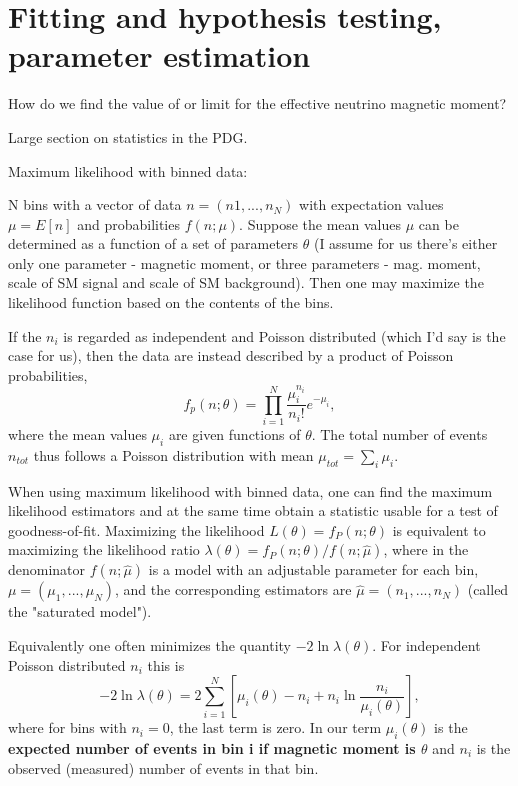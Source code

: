 \section{Fitting and hypothesis testing, parameter estimation}
How do we find the value of or limit for the effective neutrino magnetic moment?

Large section on statistics in the PDG.

Maximum likelihood with binned data:

N bins with a vector of data $n=\left(n1,...,n_N \right)$ with expectation values $\mu=E\left[n\right]$ and probabilities $f\left(n;\mu\right)$. Suppose the mean values $\mu$ can be determined as a function of a set of parameters $\theta$ (I assume for us there's either only one parameter - magnetic moment, or three parameters - mag. moment, scale of SM signal and scale of SM background). Then one may maximize the likelihood function based on the contents of the bins.

If the $n_i$ is regarded as independent and Poisson distributed (which I'd say is the case for us), then the data are instead described by a product of Poisson probabilities,
\begin{equation}
f_p\left(n;\theta\right)=\prod_{i=1}^{N} \frac{\mu_i^{n_i}}{n_i!}e^{-\mu_i},
\end{equation}
where the mean values $\mu_i$ are given functions of $\theta$. The total number of events $n_{tot}$ thus follows a Poisson distribution with mean $\mu_{tot}=\sum_i \mu_i$.

When using maximum likelihood with binned data, one can find the maximum likelihood estimators and at the same time obtain a statistic usable for a test of goodness-of-fit. Maximizing the likelihood $L\left(\theta\right)=f_P\left(n;\theta\right)$ is equivalent to maximizing the likelihood ratio $\lambda\left(\theta\right)=f_P\left(n;\theta\right) / f\left(n;\hat{\mu}\right)$, where in the denominator $f\left(n;\hat{\mu}\right)$ is a model with an adjustable parameter for each bin, $\mu=\left(\mu_1,...,\mu_N\right)$, and the corresponding estimators are $\hat{\mu}=\left(n_1,...,n_N\right)$ (called the "saturated model").

Equivalently one often minimizes the quantity $-2\ln\lambda\left(\theta\right)$. For independent Poisson distributed $n_i$ this is
\begin{equation}
-2\ln\lambda\left(\theta\right)=2\sum_{i=1}^{N}\left[\mu_i\left(\theta\right)-n_i+n_i\ln\frac{n_i}{\mu_i\left(\theta\right)}\right],
\end{equation}
where for bins with $n_i=0$, the last term is zero. In our term $\mu_i\left(\theta\right)$ is the \textbf{expected number of events in bin i if magnetic moment is $\theta$} and $n_i$ is the observed (measured) number of events in that bin.

